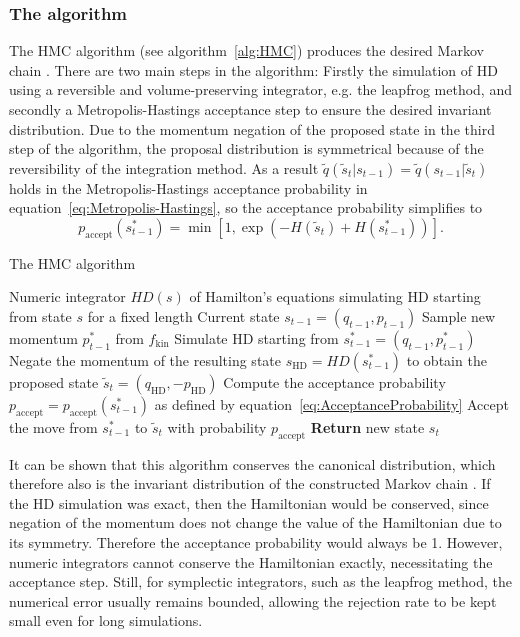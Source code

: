 \subsubsection{The algorithm}
The HMC algorithm (see algorithm~\ref{alg:HMC}) produces the desired Markov chain \parencite{Neal2011}. There are two main steps in the algorithm: Firstly the simulation of HD using a reversible and volume-preserving integrator, e.g. the leapfrog method, and secondly a Metropolis-Hastings acceptance step to ensure the desired invariant distribution. Due to the momentum negation of the proposed state in the third step of the algorithm, the proposal distribution is symmetrical because of the reversibility of the integration method. As a result $\tilde{q}(\tilde{s}_t|s_{t-1}) = \tilde{q}(s_{t-1}|\tilde{s}_t)$ holds in the Metropolis-Hastings acceptance probability in equation~\eqref{eq:Metropolis-Hastings}, so the acceptance probability simplifies to
\begin{equation} \label{eq:AcceptanceProbability}
p_{\textrm{accept}}(s^*_{t-1}) = \min[1, \exp(-H(\tilde{s}_t) + H(s^*_{t-1}))].
\end{equation}

\begin{algorithm}
\caption{The HMC algorithm}\label{alg:HMC}
\begin{algorithmic}[1]
\Require Numeric integrator $HD(s)$ of Hamilton's equations simulating HD starting from state $s$ for a fixed length
\Require Current state $s_{t-1} = (q_{t-1}, p_{t-1})$
\State Sample new momentum $p^*_{t-1}$ from $f_\textrm{kin}$
\State Simulate HD starting from $s^*_{t-1} = (q_{t-1}, p^*_{t-1})$
\State Negate the momentum of the resulting state $s_\textrm{HD} = HD(s^*_{t-1})$ to obtain the proposed state $\tilde{s}_t = (q_\textrm{HD}, - p_\textrm{HD})$
\State Compute the acceptance probability $p_\textrm{accept}=p_\textrm{accept}(s^*_{t-1})$ as defined by equation~\eqref{eq:AcceptanceProbability}
\State Accept the move from $s^*_{t-1}$ to $\tilde{s}_t$ with probability $p_\textrm{accept}$
\State \textbf{Return} new state $s_t$
\end{algorithmic}
\end{algorithm}

It can be shown that this algorithm conserves the canonical distribution, which therefore also is the invariant distribution of the constructed Markov chain \parencite{Neal2011}. If the HD simulation was exact, then the Hamiltonian would be conserved, since negation of the momentum does not change the value of the Hamiltonian due to its symmetry. Therefore the acceptance probability would always be 1. However, numeric integrators cannot conserve the Hamiltonian exactly, necessitating the acceptance step. Still, for symplectic integrators, such as the leapfrog method, the numerical error usually remains bounded, allowing the rejection rate to be kept small even for long simulations.


